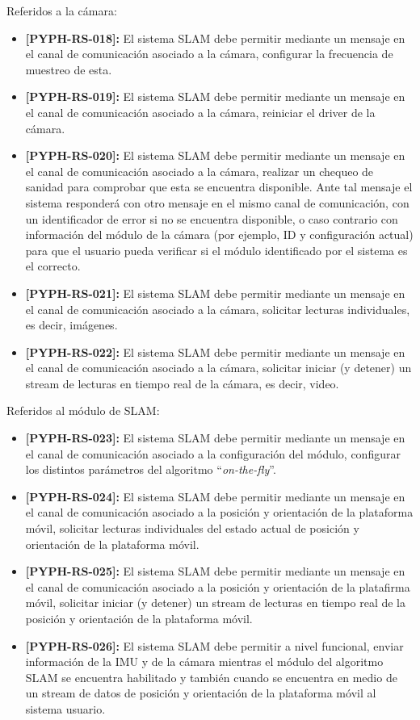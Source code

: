 \documentclass[12pt,a4paper, twosite]{article}
\begin{document}
Referidos a la cámara:

\begin{itemize}
  \item \textbf{[PYPH-RS-018]:} El sistema SLAM debe permitir mediante un mensaje en el canal de
  comunicación asociado a la cámara, configurar la frecuencia de muestreo de esta.
  \item \textbf{[PYPH-RS-019]:} El sistema SLAM debe permitir mediante un mensaje en el canal de
  comunicación asociado a la cámara, reiniciar el driver de la cámara.
  \item \textbf{[PYPH-RS-020]:} El sistema SLAM debe permitir mediante un mensaje en el canal de
  comunicación asociado a la cámara, realizar un chequeo de sanidad para comprobar que esta se
  encuentra disponible. Ante tal mensaje el sistema responderá con otro mensaje en el mismo
  canal de comunicación, con un identificador de error si no se encuentra disponible, o caso
  contrario con información del módulo de la cámara (por ejemplo, ID y configuración actual)
  para que el usuario pueda verificar si el módulo identificado por el sistema es el correcto.
  \item \textbf{[PYPH-RS-021]:} El sistema SLAM debe permitir mediante un mensaje en el canal de
  comunicación asociado a la cámara, solicitar lecturas individuales, es decir, imágenes.
  \item \textbf{[PYPH-RS-022]:} El sistema SLAM debe permitir mediante un mensaje en el canal de
  comunicación asociado a la cámara, solicitar iniciar (y detener) un stream de lecturas en
  tiempo real de la cámara, es decir, video.
\end{itemize}

Referidos al módulo de SLAM:

\begin{itemize}
  \item \textbf{[PYPH-RS-023]:} El sistema SLAM debe permitir mediante un mensaje en el canal de
  comunicación asociado a la configuración del módulo, configurar los distintos parámetros del
  algoritmo ``\textit{on-the-fly}''.
  \item \textbf{[PYPH-RS-024]:} El sistema SLAM debe permitir mediante un mensaje en el canal de
  comunicación asociado a la posición y orientación de la plataforma móvil, solicitar lecturas individuales del estado actual de posición y orientación de la plataforma móvil.
  \item \textbf{[PYPH-RS-025]:} El sistema SLAM debe permitir mediante un mensaje en el canal de
  comunicación asociado a la posición y orientación de la platafirma móvil, solicitar iniciar
  (y detener) un stream de lecturas en tiempo real de la posición y orientación de la plataforma
  móvil.
  \item \textbf{[PYPH-RS-026]:} El sistema SLAM debe permitir a nivel funcional, enviar
  información de la IMU y de la cámara mientras el módulo del algoritmo SLAM se encuentra
  habilitado y también cuando se encuentra en medio de un stream de datos de posición y
  orientación de la plataforma móvil al sistema usuario.
\end{itemize}
\end{document}
